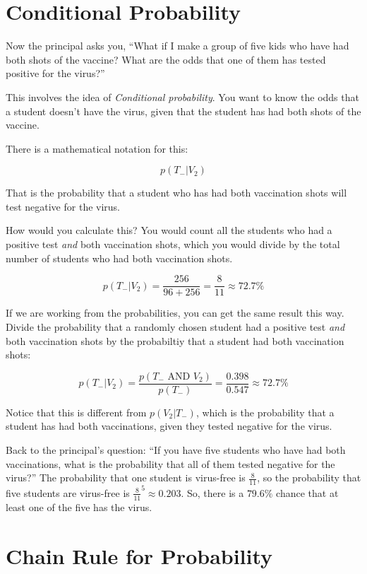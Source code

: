 \section{Conditional Probability}

Now the principal asks you, ``What if I make a group of five kids who
have had both shots of the vaccine? What are the odds that one of them
has tested positive for the virus?''

This involves the idea of \textit{Conditional probability}.  You want
to know the odds that a student doesn't have the virus, given that
the student has had both shots of the vaccine.

There is a mathematical notation for this:

$$p(T_{-} | V_{2})$$

That is the probability that a student who has had both vaccination
shots will test negative for the virus.

How would you calculate this? You would count all the students who had
a positive test \textit{and} both vaccination shots, which you would
divide by the total number of students who had both vaccination shots.

$$p(T_{-} | V_{2}) = \frac{256}{96 + 256} = \frac{8}{11} \approx 72.7\%$$

If we are working from the probabilities, you can get the same result
this way. Divide the probability that a randomly chosen student had a
positive test \textit{and} both vaccination shots by the probabiltiy
that a student had both vaccination shots:

$$p(T_{-} | V_{2}) = \frac{p(T_{-} \text{ AND } V_{2})}{p(T_{-})} =  \frac{0.398}{0.547} \approx 72.7\%$$

Notice that this is different from $p( V_{2} | T_{-})$, which is the
probability that a student has had both vaccinations, given they
tested negative for the virus.

Back to the principal's question: ``If you have five students who have had
both vaccinations, what is the probability that all of them tested
negative for the virus?'' The probability that one student is virus-free
is $\frac{8}{11}$, so the probability that five students are virus-free
is $\frac{8}{11}^5 \approx 0.203$.  So, there is a $79.6\%$ chance
that at least one of the five has the virus.

\section{Chain Rule for Probability}

